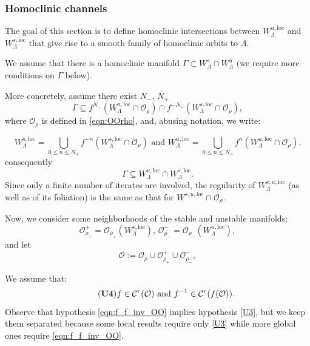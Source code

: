 \documentclass[11pt]{amsart}
\theoremstyle{definition}
\theoremstyle{remark}
\numberwithin{equation}{section}
\newcommand{\C}{\mathcal{C}}
\newcommand{\OO}{\mathcal{O}}
\begin{document}
 \subsubsection{Homoclinic channels}
 \label{sec:homoclinic_channel}
 The goal of this section is to define homoclinic intersections between $W^{u,\textrm{loc}}_\Lambda$ and $W^{s,\textrm{loc}}_\Lambda$ that give rise to a smooth family of homoclinic orbits to $\Lambda$.


We assume that   there is  a homoclinic manifold
$\Gamma \subset W_\Lambda^s\cap W_\Lambda^u$ (we require  more conditions on $\Gamma$ below).

More concretely, assume there exist  $N_-$, $N_+$
\[
\Gamma\subseteq f^{N_-}(W^{u,\textrm{loc}}_\Lambda \cap\OO_\rho)\cap f^{-N_+}(W^{s,\textrm{loc}}_\Lambda\cap\OO_\rho),
\]
where $\OO_\rho$ is defined in \eqref{eqn:OOrho},  and, abusing notation, we write:


\[
W^{s,\textrm{loc}}_\Lambda = \bigcup_{0\le n \le  N_+} f^{-n}(W^{s,\textrm{loc}}_\Lambda\cap\OO_\rho)  \textrm{ and }W^{u,\textrm{loc}}_\Lambda=\bigcup_{0\le n \le  N_-} f^{n}(W^{u,\textrm{loc}}_\Lambda\cap\OO_\rho).
\]
consequently
\begin{equation}
\label{eqn:Gamma_O N_plus_N_minus}
\Gamma\subseteq W^{u,\textrm{loc}}_\Lambda \cap W^{s,\textrm{loc}}_\Lambda .
\end{equation}
Since only a finite number of iterates are involved, the regularity of
$W^{s,u,\textrm{loc}}_\Lambda$ (as well as of its foliation) is the same as that for $W^{s,u,\textrm{loc}} \cap \OO_\rho$.

Now, we consider some neighborhoods of the stable
and unstable manifolds:
\begin{equation}
\label{eqn:N_minus_plus}
\OO^{+}_{\rho_+}  = \OO_{\rho_+} (W^{s,\textrm{loc}}_\Lambda),\,
\OO^{-}_{\rho_-} = \OO_{\rho_-}  (W^{u,\textrm{loc}}_\Lambda),
\end{equation}
and let
\begin{equation}\label{eqn:OO}
\OO:=\OO_\rho\cup \OO^+_{\rho_+} \cup \OO^-_{\rho_-},
\end{equation}

We   assume that:
\begin{equation} \label{eqn:f_f_inv_OO}\tag{{\bf U4}}
f \in \C^r( \OO) \textrm{ and }
    f^{-1}  \in \C^r( f(\OO)) .
\end{equation}
Observe that hypothesis \ref{eqn:f_f_inv_OO}  implies hypothesis \eqref{U3}, but we keep  them separated because
   some local results   require only  \eqref{U3} while more global ones require  \ref{eqn:f_f_inv_OO}.
\end{document}
